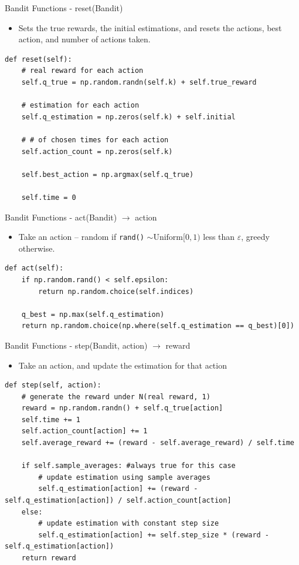\documentclass{beamer}
\begin{document}
\begin{frame}[fragile]{Bandit Functions - reset(Bandit)}
\begin{itemize}
	\item Sets the true rewards, the initial estimations, and resets the actions, best action, and number of actions taken.
\end{itemize}
\begin{lstlisting}
def reset(self):
    # real reward for each action
    self.q_true = np.random.randn(self.k) + self.true_reward

    # estimation for each action
    self.q_estimation = np.zeros(self.k) + self.initial

    # # of chosen times for each action
    self.action_count = np.zeros(self.k)

    self.best_action = np.argmax(self.q_true)

    self.time = 0
\end{lstlisting}
\end{frame}
\begin{frame}[fragile]{Bandit Functions - act(Bandit) $\to$ action}
\begin{itemize}
	\item Take an action -- random if \texttt{rand()} $\sim \text{Uniform}[0,1)$ less than $\varepsilon$, greedy otherwise.
\end{itemize}
\begin{lstlisting}
def act(self):
    if np.random.rand() < self.epsilon:
        return np.random.choice(self.indices)

    q_best = np.max(self.q_estimation)
    return np.random.choice(np.where(self.q_estimation == q_best)[0])
\end{lstlisting}
\end{frame}
\begin{frame}[fragile]{Bandit Functions - step(Bandit, action) $\to$ reward}
\begin{itemize}
	\item Take an action, and update the estimation for that action
\end{itemize}
\begin{lstlisting}
def step(self, action):
    # generate the reward under N(real reward, 1)
    reward = np.random.randn() + self.q_true[action]
    self.time += 1
    self.action_count[action] += 1
    self.average_reward += (reward - self.average_reward) / self.time

    if self.sample_averages: #always true for this case
        # update estimation using sample averages
        self.q_estimation[action] += (reward - self.q_estimation[action]) / self.action_count[action]
    else:
        # update estimation with constant step size
        self.q_estimation[action] += self.step_size * (reward - self.q_estimation[action])
    return reward
\end{lstlisting}
\end{frame}
\end{document}
